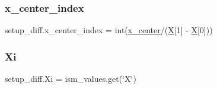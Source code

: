 \subsubsection{\texorpdfstring{x\+\_\+center\+\_\+index}{x\_center\_index}}
{\footnotesize\ttfamily setup\+\_\+diff.\+x\+\_\+center\+\_\+index = int(\hyperlink{namespacesetup__diff_a644659f9e800f2cfde1ba2f023a7467b}{x\+\_\+center}/(\hyperlink{namespacesetup__diff_ad01f7c1ee607d8a67926e30be25385f1}{X}\mbox{[}1\mbox{]} -\/ \hyperlink{namespacesetup__diff_ad01f7c1ee607d8a67926e30be25385f1}{X}\mbox{[}0\mbox{]}))}

\mbox{\label{namespacesetup__diff_ac53a4b18f3e357986771793bfebb4ed7}} 
\subsubsection{\texorpdfstring{Xi}{Xi}}
{\footnotesize\ttfamily setup\+\_\+diff.\+Xi = ism\+\_\+values.\+get(\char`\"{}X\char`\"{})}

